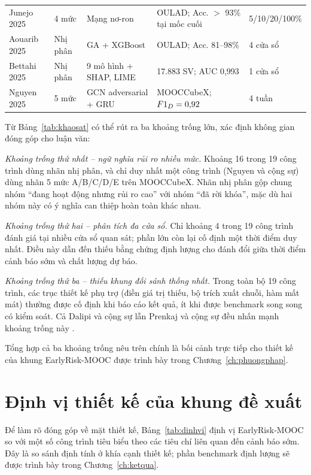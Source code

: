 \begin{table}[H]
\begin{tabularx}{\textwidth}{@{}p{2.4cm} p{1.6cm} p{2.6cm} X p{1.7cm}@{}}
Junejo 2025 \cite{Junejo2025} & 4 mức & Mạng nơ-ron & OULAD; Acc. $>$ 93\% tại mốc cuối & 5/10/20/100\% \\
Aouarib 2025 \cite{Aouarib2025} & Nhị phân & GA + XGBoost & OULAD; Acc. 81--98\% & 4 cửa sổ \\
Bettahi 2025 \cite{Bettahi2025} & Nhị phân & 9 mô hình + SHAP, LIME & 17.883 SV; AUC 0,993 & 1 cửa sổ \\
Nguyen 2025 \cite{Nguyen2025} & 5 mức & GCN adversarial + GRU & MOOCCubeX; $F1_{D} = 0{,}92$ & 4 tuần \\
\bottomrule
\end{tabularx}
\end{table}

Từ Bảng~\ref{tab:khaosat} có thể rút ra ba khoảng trống lớn, xác định không gian đóng góp cho luận văn:

\textit{Khoảng trống thứ nhất -- ngữ nghĩa rủi ro nhiều mức.} Khoảng 16 trong 19 công trình dùng nhãn nhị phân, và chỉ duy nhất một công trình (Nguyen và cộng sự) dùng nhãn 5 mức A/B/C/D/E trên MOOCCubeX. Nhãn nhị phân gộp chung nhóm ``đang hoạt động nhưng rủi ro cao'' với nhóm ``đã rời khóa'', mặc dù hai nhóm này có ý nghĩa can thiệp hoàn toàn khác nhau.

\textit{Khoảng trống thứ hai -- phân tích đa cửa sổ.} Chỉ khoảng 4 trong 19 công trình đánh giá tại nhiều cửa sổ quan sát; phần lớn còn lại cố định một thời điểm duy nhất. Điều này dẫn đến thiếu bằng chứng định lượng cho đánh đổi giữa thời điểm cảnh báo sớm và chất lượng dự báo.

\textit{Khoảng trống thứ ba -- thiếu khung đối sánh thống nhất.} Trong toàn bộ 19 công trình, các trục thiết kế phụ trợ (điền giá trị thiếu, bộ trích xuất chuỗi, hàm mất mát) thường được cố định khi báo cáo kết quả, ít khi được benchmark song song có kiểm soát. Cả Dalipi và cộng sự lẫn Prenkaj và cộng sự đều nhấn mạnh khoảng trống này \cite{Dalipi2018,Prenkaj2020}.

Tổng hợp cả ba khoảng trống nêu trên chính là bối cảnh trực tiếp cho thiết kế của khung EarlyRisk-MOOC được trình bày trong Chương~\ref{ch:phuongphap}.

\section{Định vị thiết kế của khung đề xuất}
\label{sec:dinhvi}

Để làm rõ đóng góp về mặt thiết kế, Bảng~\ref{tab:dinhvi} định vị EarlyRisk-MOOC so với một số công trình tiêu biểu theo các tiêu chí liên quan đến cảnh báo sớm. Đây là so sánh định tính ở khía cạnh thiết kế; phần benchmark định lượng sẽ được trình bày trong Chương~\ref{ch:ketqua}.

